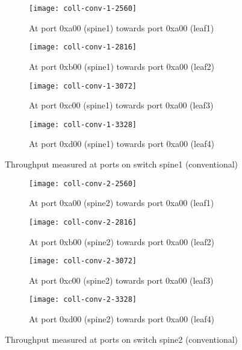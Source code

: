 \begin{figure}
    \centering
    \begin{subfigure}{.24\linewidth}
        \texttt{[image: coll-conv-1-2560]}
        \caption{At port 0xa00 (spine1) \newline towards port 0xa00 (leaf1)}%
        \label{fig:spine1-leaf1-conv}
    \end{subfigure}
    \begin{subfigure}{.24\linewidth}
        \texttt{[image: coll-conv-1-2816]}
        \caption{At port 0xb00 (spine1) \newline towards port 0xa00 (leaf2)}%
        \label{fig:spine1-leaf2-conv}
    \end{subfigure}
    \begin{subfigure}{.24\linewidth}
        \texttt{[image: coll-conv-1-3072]}
        \caption{At port 0xc00 (spine1) \newline towards port 0xa00 (leaf3)}%
        \label{fig:spine1-leaf3-conv}
    \end{subfigure}
    \begin{subfigure}{.24\linewidth}
        \texttt{[image: coll-conv-1-3328]}
        \caption{At port 0xd00 (spine1) \newline towards port 0xa00 (leaf4)}%
        \label{fig:spine1-leaf4-conv}
    \end{subfigure}
    \caption{Throughput measured at ports on switch spine1 (conventional)}
    \label{fig:coll-spine1-conv}
    \begin{subfigure}{.24\linewidth}
        \texttt{[image: coll-conv-2-2560]}
        \caption{At port 0xa00 (spine2) \newline towards port 0xa00 (leaf1)}%
        \label{fig:spine2-leaf1-conv}
    \end{subfigure}
    \begin{subfigure}{.24\linewidth}
        \texttt{[image: coll-conv-2-2816]}
        \caption{At port 0xb00 (spine2) \newline towards port 0xa00 (leaf2)}%
        \label{fig:spine2-leaf2-conv}
    \end{subfigure}
    \begin{subfigure}{.24\linewidth}
        \texttt{[image: coll-conv-2-3072]}
        \caption{At port 0xc00 (spine2) \newline towards port 0xa00 (leaf3)}%
        \label{fig:spine2-leaf3-conv}
    \end{subfigure}
    \begin{subfigure}{.24\linewidth}
        \texttt{[image: coll-conv-2-3328]}
        \caption{At port 0xd00 (spine2) \newline towards port 0xa00 (leaf4)}%
        \label{fig:spine2-leaf4-conv}
    \end{subfigure}
    \caption{Throughput measured at ports on switch spine2 (conventional)}
    \label{fig:coll-spine2-conv}
\end{figure}

